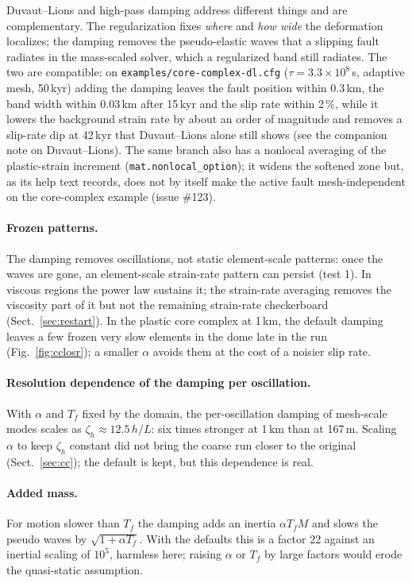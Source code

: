 \documentclass[11pt]{article}
\newcommand{\code}[1]{\texttt{#1}}
\begin{document}
Duvaut--Lions and high-pass damping address different things and are complementary. The
regularization fixes \emph{where} and \emph{how wide} the deformation localizes; the damping
removes the pseudo-elastic waves that a slipping fault radiates in the mass-scaled solver, which a
regularized band still radiates. The two are compatible: on \code{examples/core-complex-dl.cfg}
($\tau=3.3\times10^8$\,s, adaptive mesh, 50\,kyr) adding the damping leaves the fault position
within 0.3\,km, the band width within 0.03\,km after 15\,kyr and the slip rate within 2\,\%, while it
lowers the background strain rate by about an order of magnitude and removes a slip-rate dip at
42\,kyr that Duvaut--Lions alone still shows (see the companion note on Duvaut--Lions). The same branch also has a nonlocal averaging of the plastic-strain
increment (\code{mat.nonlocal\_option}); it widens the softened zone but, as its help text records,
does not by itself make the active fault mesh-independent on the core-complex example (issue
\#123).

\paragraph{Frozen patterns.} The damping removes oscillations, not static element-scale
patterns: once the waves are gone, an element-scale strain-rate pattern can persist (test 1). In
viscous regions the power law sustains it; the strain-rate averaging removes the viscosity part of
it but not the remaining strain-rate checkerboard (Sect.~\ref{sec:restart}). In the plastic core
complex at 1\,km, the default damping leaves a few frozen very slow elements in the dome late in the
run (Fig.~\ref{fig:cclosr}); a smaller $\alpha$ avoids them at the cost of a noisier slip rate.

\paragraph{Resolution dependence of the damping per oscillation.} With $\alpha$ and $T_f$ fixed by
the domain, the per-oscillation damping of mesh-scale modes scales as $\zeta_h\approx12.5\,h/L$:
six times stronger at 1\,km than at 167\,m. Scaling $\alpha$ to keep $\zeta_h$ constant did not
bring the coarse run closer to the original (Sect.~\ref{sec:cc}); the default is kept, but this
dependence is real.

\paragraph{Added mass.} For motion slower than $T_f$ the damping adds an inertia $\alpha T_f M$ and
slows the pseudo waves by $\sqrt{1+\alpha T_f}$. With the defaults this is a factor 22 against an
inertial scaling of $10^5$, harmless here; raising $\alpha$ or $T_f$ by large factors would erode the
quasi-static assumption.
\end{document}
